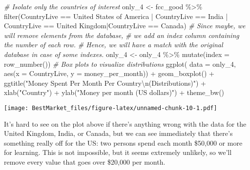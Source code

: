 \documentclass[
]{article}
\newenvironment{Shaded}{\begin{snugshade}}{\end{snugshade}}
\newcommand{\AttributeTok}[1]{\textcolor[rgb]{0.77,0.63,0.00}{#1}}
\newcommand{\CommentTok}[1]{\textcolor[rgb]{0.56,0.35,0.01}{\textit{#1}}}
\newcommand{\FunctionTok}[1]{\textcolor[rgb]{0.00,0.00,0.00}{#1}}
\newcommand{\NormalTok}[1]{#1}
\newcommand{\OtherTok}[1]{\textcolor[rgb]{0.56,0.35,0.01}{#1}}
\newcommand{\SpecialCharTok}[1]{\textcolor[rgb]{0.00,0.00,0.00}{#1}}
\newcommand{\StringTok}[1]{\textcolor[rgb]{0.31,0.60,0.02}{#1}}
\begin{document}
\begin{Shaded}
\begin{Highlighting}[]
\CommentTok{\# Isolate only the countries of interest}
\NormalTok{only\_4  }\OtherTok{\textless{}{-}}\NormalTok{  fcc\_good }\SpecialCharTok{\%\textgreater{}\%} 
  \FunctionTok{filter}\NormalTok{(CountryLive }\SpecialCharTok{==} \StringTok{\textquotesingle{}United States of America\textquotesingle{}} \SpecialCharTok{|}\NormalTok{ CountryLive }\SpecialCharTok{==} \StringTok{\textquotesingle{}India\textquotesingle{}} \SpecialCharTok{|}\NormalTok{ CountryLive }\SpecialCharTok{==} \StringTok{\textquotesingle{}United Kingdom\textquotesingle{}}\SpecialCharTok{|}\NormalTok{CountryLive }\SpecialCharTok{==} \StringTok{\textquotesingle{}Canada\textquotesingle{}}\NormalTok{)}
\CommentTok{\# Since maybe, we will remove elements from the database, }
\CommentTok{\# we add an index column containing the number of each row. }
\CommentTok{\# Hence, we will have a match with the original database in case of some indexes.}
\NormalTok{only\_4 }\OtherTok{\textless{}{-}}\NormalTok{ only\_4 }\SpecialCharTok{\%\textgreater{}\%}
  \FunctionTok{mutate}\NormalTok{(}\AttributeTok{index =} \FunctionTok{row\_number}\NormalTok{())}
\CommentTok{\# Box plots to visualize distributions}
\FunctionTok{ggplot}\NormalTok{( }\AttributeTok{data =}\NormalTok{ only\_4, }\FunctionTok{aes}\NormalTok{(}\AttributeTok{x =}\NormalTok{ CountryLive, }\AttributeTok{y =}\NormalTok{ money\_per\_month)) }\SpecialCharTok{+}
  \FunctionTok{geom\_boxplot}\NormalTok{() }\SpecialCharTok{+}
  \FunctionTok{ggtitle}\NormalTok{(}\StringTok{"Money Spent Per Month Per Country}\SpecialCharTok{\textbackslash{}n}\StringTok{(Distributions)"}\NormalTok{) }\SpecialCharTok{+}
  \FunctionTok{xlab}\NormalTok{(}\StringTok{"Country"}\NormalTok{) }\SpecialCharTok{+}
  \FunctionTok{ylab}\NormalTok{(}\StringTok{"Money per month (US dollars)"}\NormalTok{) }\SpecialCharTok{+}
  \FunctionTok{theme\_bw}\NormalTok{()}
\end{Highlighting}
\end{Shaded}

\texttt{[image: BestMarket\_files/figure-latex/unnamed-chunk-10-1.pdf]}

It's hard to see on the plot above if there's anything wrong with the
data for the United Kingdom, India, or Canada, but we can see
immediately that there's something really off for the US: two persons
spend each month \$50,000 or more for learning. This is not impossible,
but it seems extremely unlikely, so we'll remove every value that goes
over \$20,000 per month.
\end{document}
